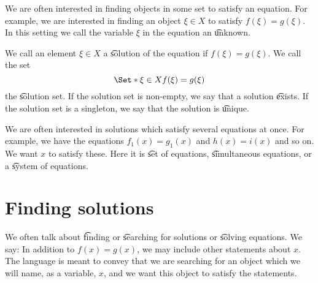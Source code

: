 We are often interested in finding objects in some set to satisfy an equation.
For example, we are interested in finding an object $\xi  \in X$ to satisfy $f(\xi ) = g(\xi )$.
In this setting we call the variable $\xi $ in the equation an \t{unknown}.

We call an element $\xi  \in X$ a \t{solution} of the equation if $f(\xi ) = g(\xi )$.
We call the set
    \[
\Set*{\xi  \in X}{f(\xi ) = g(\xi )}
    \]
the \t{solution set}.
If the solution set is non-empty, we say that a solution \t{exists}.
If the solution set is a singleton, we say that the solution is \t{unique}.

We are often interested in solutions which satisfy several equations at once.
For example, we have the equations $f_1(x) = g_1(x)$ and $h(x) = i(x)$ and so on.
We want $x$ to satisfy these.
Here it is \t{set of equations}, \t{simultaneous equations}, or a \t{system of equations}.

\section*{Finding solutions}

We often talk about \t{finding} or \t{searching} for solutions or \t{solving equations}.
We say: 
In addition to $f(x) = g(x)$, we may include other statements about $x$.
The language is meant to convey that we are searching for an object which we will name, as a variable, $x$, and we want this object to satisfy the statements.
